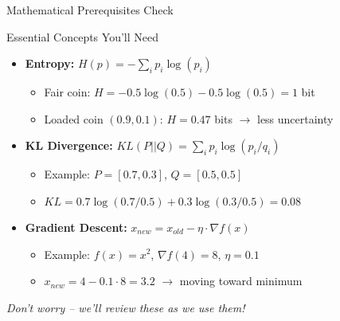 \documentclass[aspectratio=169]{beamer}
\begin{document}
\begin{frame}{Mathematical Prerequisites Check}

\begin{block}{Essential Concepts You'll Need}
\begin{itemize}
    \item \textbf{Entropy:} $H(p) = -\sum_i p_i \log(p_i)$
    \begin{itemize}
        \item Fair coin: $H = -0.5\log(0.5) - 0.5\log(0.5) = 1$ bit
        \item Loaded coin $(0.9, 0.1)$: $H = 0.47$ bits $\rightarrow$ less uncertainty
    \end{itemize}
    
    \item \textbf{KL Divergence:} $KL(P||Q) = \sum_i p_i \log(p_i/q_i)$
    \begin{itemize}
        \item Example: $P=[0.7,0.3]$, $Q=[0.5,0.5]$
        \item $KL = 0.7\log(0.7/0.5) + 0.3\log(0.3/0.5) = 0.08$
    \end{itemize}
    
    \item \textbf{Gradient Descent:} $x_{new} = x_{old} - \eta \cdot \nabla f(x)$
    \begin{itemize}
        \item Example: $f(x)=x^2$, $\nabla f(4)=8$, $\eta=0.1$
        \item $x_{new} = 4 - 0.1 \cdot 8 = 3.2$ $\rightarrow$ moving toward minimum
    \end{itemize}
\end{itemize}
\end{block}

\centering
\textit{Don't worry -- we'll review these as we use them!}

\end{frame}
\end{document}
